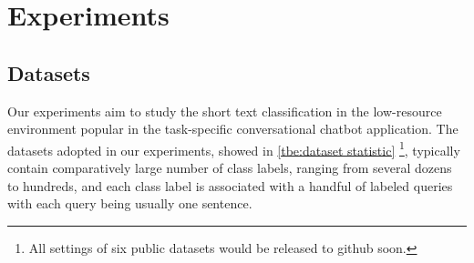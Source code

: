 \section{Experiments}
\label{sec:exp}

\begin{table}
  \begin{centering}
    \par
  \end{centering}
  \caption{Statistics for all datasets and few shot settings.}

  \label{tbe:dataset statistic}
\end{table}

\subsection{Datasets}
Our experiments aim to study the short text classification in the low-resource environment popular in the task-specific conversational chatbot application.
The datasets adopted in our experiments, showed in \ref{tbe:dataset statistic} \footnote{All settings of six public datasets would be released to github soon.}, typically contain comparatively large number of class labels, ranging from several dozens to hundreds, and each class label is associated with a handful of labeled queries with each query being usually one sentence. 

